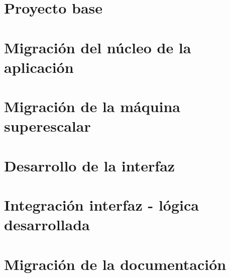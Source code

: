 

\section{Proyecto base}
\label{5:sec1} 


\section{Migración del núcleo de la aplicación}
\label{5:sec2} 


\section{Migración de la máquina superescalar}
\label{5:sec3} 


\section{Desarrollo de la interfaz}
\label{5:sec4} 


\section{Integración interfaz - lógica desarrollada}
\label{5:sec5} 


\section{Migración de la documentación}
\label{5:sec6} 

